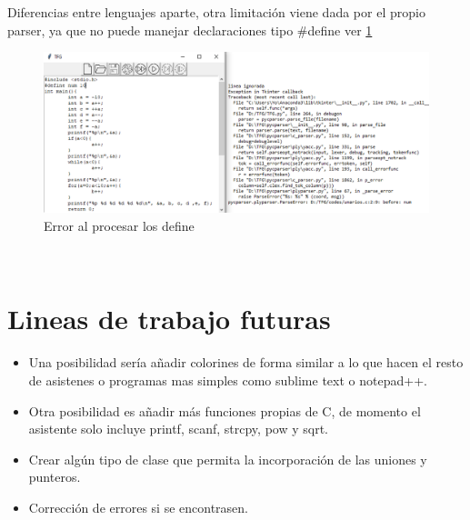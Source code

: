 Diferencias entre lenguajes aparte, otra limitación viene dada por el propio parser, ya que no puede manejar declaraciones tipo \#define ver \ref{fig:define}
\begin{figure}[ht]
\centering
\includegraphics[width=\textwidth]{img/error_define.png}
\caption{Error al procesar los define}
\label{fig:define}
\end{figure}
\\

\section{Lineas de trabajo futuras}
\begin{itemize}
\item Una posibilidad sería añadir colorines de forma similar a lo que hacen el resto de asistenes o programas mas simples como sublime text o notepad++.
\item Otra posibilidad  es añadir más funciones propias de C, de momento el asistente solo incluye printf, scanf, strcpy, pow y sqrt.
\item Crear algún tipo de clase que permita la incorporación de las uniones y punteros.
\item Corrección de errores si se encontrasen.
\end{itemize}
